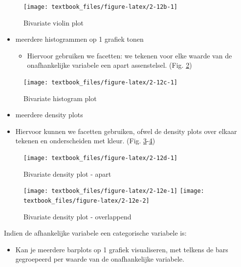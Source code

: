 \documentclass[]{tufte-book}
\providecommand{\tightlist}{%
  \setlength{\itemsep}{0pt}\setlength{\parskip}{0pt}}
\begin{document}
\begin{figure}
\texttt{[image: textbook\_files/figure-latex/2-12b-1]} \caption[Bivariate violin plot]{Bivariate violin plot}\label{fig:2-12b}
\end{figure}

\begin{itemize}
\tightlist
\item
  meerdere histogrammen op 1 grafiek tonen

  \begin{itemize}
  \tightlist
  \item
    Hiervoor gebruiken we facetten: we tekenen voor elke waarde van de onafhankelijke variabele een apart assenstelsel. (Fig. \ref{fig:2-12c})
  \end{itemize}
\end{itemize}

\begin{figure}
\texttt{[image: textbook\_files/figure-latex/2-12c-1]} \caption[Bivariate histogram plot]{Bivariate histogram plot}\label{fig:2-12c}
\end{figure}

\begin{itemize}
\tightlist
\item
  meerdere density plots
\item
  Hiervoor kunnen we facetten gebruiken, ofwel de density plots over elkaar tekenen en onderscheiden met kleur. (Fig. \ref{fig:2-12d}-\ref{fig:2-12e})
\end{itemize}

\begin{figure}
\texttt{[image: textbook\_files/figure-latex/2-12d-1]} \caption[Bivariate density plot - apart]{Bivariate density plot - apart}\label{fig:2-12d}
\end{figure}

\begin{figure}
\texttt{[image: textbook\_files/figure-latex/2-12e-1]} \texttt{[image: textbook\_files/figure-latex/2-12e-2]} \caption[Bivariate density plot - overlappend]{Bivariate density plot - overlappend}\label{fig:2-12e}
\end{figure}

Indien de afhankelijke variabele een categorische variabele is:

\begin{itemize}
\tightlist
\item
  Kan je meerdere barplots op 1 grafiek visualiseren, met telkens de bars gegroepeerd per waarde van de onafhankelijke variabele.
\end{itemize}
\end{document}
